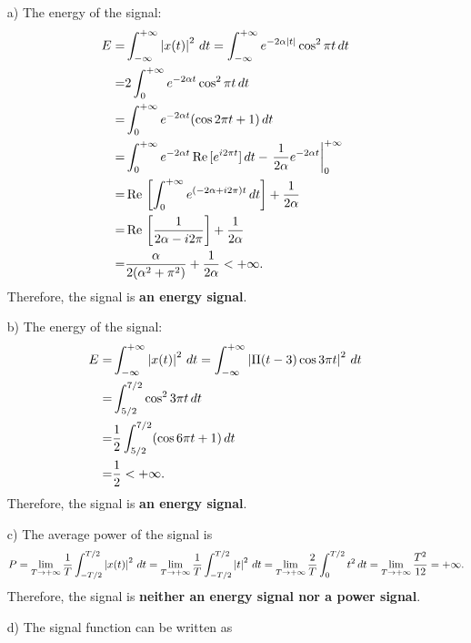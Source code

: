\documentclass{assignment}
\begin{document}
\begin{sol}
    \begin{itemize}
        \item[a)] The energy of the signal:
        \begin{align}
            \notag E=&\int_{-\infty}^{+\infty}\left\lvert x(t)\right\rvert^2\,dt=\int_{-\infty}^{+\infty}e^{-2\alpha\left\lvert t\right\rvert}\cos^2\pi t\,dt\\
            \notag=&2\int_0^{+\infty}e^{-2\alpha t}\cos^2\pi t\,dt\\
            \notag=&\int_0^{+\infty}e^{-2\alpha t}(\cos 2\pi t+1)\,dt\\
            \notag=&\int_0^{+\infty}e^{-2\alpha t}\,\text{Re}\,[e^{i2\pi t}]\,dt-\left.\frac{1}{2\alpha}e^{-2\alpha t}\right\lvert_{0}^{+\infty}\\
            \notag=&\,\text{Re}\,\left[\int_0^{+\infty}e^{(-2\alpha+i2\pi)t}\,dt\right]+\frac{1}{2\alpha}\\
            \notag=&\,\text{Re}\,\left[\frac{1}{2\alpha-i2\pi}\right]+\frac{1}{2\alpha}\\
            =&\frac{\alpha}{2(\alpha^2+\pi^2)}+\frac{1}{2\alpha}<+\infty.
        \end{align}
        Therefore, the signal is \textbf{an energy signal}.
        \item[b)] The energy of the signal:
        \begin{align}
            \notag E=&\int_{-\infty}^{+\infty}\left\lvert x(t)\right\rvert^2\,dt=\int_{-\infty}^{+\infty}\left\lvert\Pi(t-3)\cos 3\pi t\right\rvert^2\,dt\\
            \notag=&\int_{5/2}^{7/2}\cos^23\pi t\,dt\\
            \notag=&\frac{1}{2}\int_{5/2}^{7/2}(\cos 6\pi t+1)\,dt\\
            \notag=&\frac{1}{2}<+\infty.
        \end{align}
        Therefore, the signal is \textbf{an energy signal}.
        \item[c)] The average power of the signal is
        \begin{align}
            P=\lim_{T\rightarrow+\infty}\frac{1}{T}\int_{-T/2}^{T/2}\left\lvert x(t)\right\rvert^2\,dt=\lim_{T\rightarrow+\infty}\frac{1}{T}\int_{-T/2}^{T/2}\left\lvert t\right\rvert^2\,dt=\lim_{T\rightarrow+\infty}\frac{2}{T}\int_0^{T/2}t^2\,dt=\lim_{T\rightarrow+\infty}\frac{T^2}{12}=+\infty.
        \end{align}
        Therefore, the signal is \textbf{neither an energy signal nor a power signal}.
        \item[d)] The signal function can be written as

\end{itemize}
\end{sol}
\end{document}
